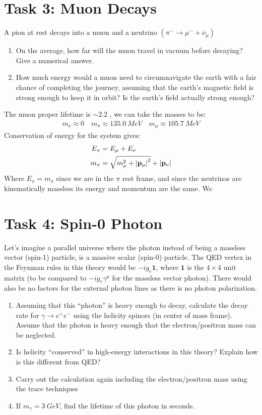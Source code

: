 \documentclass[12pt]{article}
\begin{document}
\section*{Task 3: Muon Decays}
\begin{problem}
  A pion at rest decays into a muon and a neutrino $(\pi^-\to\mu^-+\overline{\nu}_\mu)$
  \begin{enumerate}
  \item On the average, how far will the muon travel in vacuum before decaying? Give a numerical answer. 
  \item How much energy would a muon need to circumnavigate the earth with a fair chance of completing the journey, assuming that the earth's magnetic field is strong enough to keep it in orbit? Is the earth's field actually strong enough?
  \end{enumerate}
\end{problem}
The muon proper lifetime is $\sim2.2$ , we can take the masses to be:
\begin{align*}
  m_\nu\approx0\quad
  m_\pi\approx\SI{135.0}{MeV}\quad
  m_\mu\approx\SI{105.7}{MeV}
\end{align*}
Conservation of energy for the system gives:
\begin{align*}
  E_\pi&=E_\mu+E_\nu\\
  m_\pi&=\sqrt{m_\mu^2+\abs{\vb{p}_\mu}^2}+\abs{\vb{p}_\nu}
\end{align*}
Where $E_\pi=m_\pi$ since we are in the $\pi$ rest frame, and since the neutrinos are kinematically massless its energy and momentum are the same. We
\newpage
\section*{Task 4: Spin-0 Photon}
\begin{problem}
  Let's imagine a parallel universe where the photon instead of being a massless vector (spin-1) particle, is a massive scalar (spin-0) particle. The QED vertex in the Feynman rules in this theory would be $-ig_e\bm{1}$, where $\bm{1}$ is the $4\times4$ unit matrix (to be compared to $-ig_e\gamma^\mu$ for the massless vector photon). There would also be no factors for the external photon lines as there is no photon polarization.
  \begin{enumerate}
  \item Assuming that this ``photon'' is heavy enough to decay, calculate the decay rate for $\gamma\to e^+e^-$ using the helicity spinors (in center of mass frame). Assume that the photon is heavy enough that the electron/positron mass can be neglected. 
  \item Is helicity ``conserved'' in high-energy interactions in this theory? Explain how is this different from QED?
  \item Carry out the calculation again including the electron/positron mass using the trace techniques
  \item If $m_\gamma=\SI{3}{GeV}$, find the lifetime of this photon in seconds.
  \end{enumerate}
\end{problem}
\end{document}
